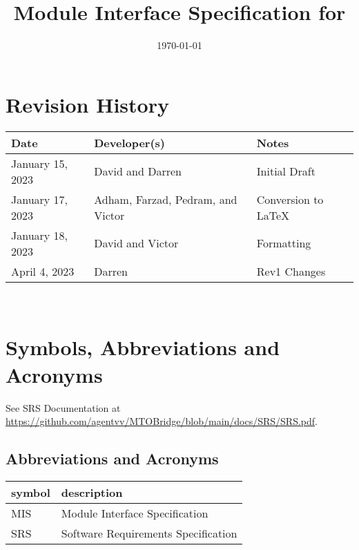 \documentclass[12pt, titlepage]{article}
\begin{document}
\title{Module Interface Specification for \progname{}}

\author{\authname}

\date{\today}

\maketitle


\section{Revision History}

\begin{tabularx}{\textwidth}{p{3cm}p{7cm}X}
\toprule {\bf Date} & {\bf  Developer(s)} & {\bf Notes}\\
\midrule
January 15, 2023 & David and Darren & Initial Draft\\
January 17, 2023 & Adham, Farzad, Pedram, and Victor & Conversion to LaTeX\\
January 18, 2023 & David and Victor & Formatting\\
April 4, 2023 & Darren & Rev1 Changes\\
\bottomrule
\end{tabularx}

~\newpage

\section{Symbols, Abbreviations and Acronyms}

See SRS Documentation at \url{https://github.com/agentvv/MTOBridge/blob/main/docs/SRS/SRS.pdf}.

\subsection{Abbreviations and Acronyms}
\renewcommand{\arraystretch}{1.2}
\begin{tabular}{l l} 
  \toprule		
  \textbf{symbol} & \textbf{description}\\
  \midrule
  MIS & Module Interface Specification \\
  SRS & Software Requirements Specification\\
  \bottomrule
\end{tabular}\\

\newpage
\end{document}
